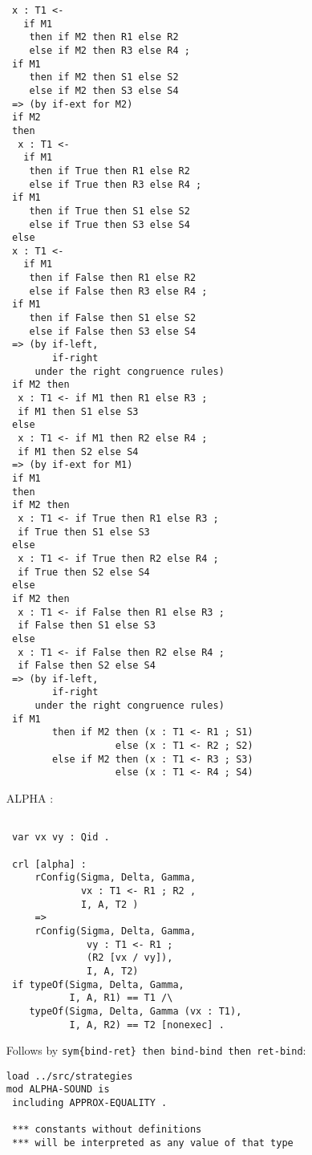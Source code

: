 \documentclass{article}
\begin{document}
\begin{itemize}
\begin{lstlisting}
 x : T1 <- 
   if M1 
    then if M2 then R1 else R2
    else if M2 then R3 else R4 ;
 if M1 
    then if M2 then S1 else S2
    else if M2 then S3 else S4
 => (by if-ext for M2)
 if M2 
 then  
  x : T1 <- 
   if M1 
    then if True then R1 else R2
    else if True then R3 else R4 ;
 if M1 
    then if True then S1 else S2
    else if True then S3 else S4
 else
 x : T1 <- 
   if M1 
    then if False then R1 else R2
    else if False then R3 else R4 ;
 if M1 
    then if False then S1 else S2
    else if False then S3 else S4
 => (by if-left, 
        if-right 
     under the right congruence rules)
 if M2 then
  x : T1 <- if M1 then R1 else R3 ;
  if M1 then S1 else S3
 else
  x : T1 <- if M1 then R2 else R4 ;
  if M1 then S2 else S4
 => (by if-ext for M1)
 if M1 
 then    
 if M2 then
  x : T1 <- if True then R1 else R3 ;
  if True then S1 else S3
 else
  x : T1 <- if True then R2 else R4 ;
  if True then S2 else S4
 else
 if M2 then
  x : T1 <- if False then R1 else R3 ;
  if False then S1 else S3
 else
  x : T1 <- if False then R2 else R4 ;
  if False then S2 else S4 
 => (by if-left, 
        if-right 
     under the right congruence rules)
 if M1 
        then if M2 then (x : T1 <- R1 ; S1) 
                   else (x : T1 <- R2 ; S2)
        else if M2 then (x : T1 <- R3 ; S3) 
                   else (x : T1 <- R4 ; S4)               
\end{lstlisting}  
  
\item[ALPHA]:
\begin{lstlisting}  
 
 var vx vy : Qid . 
        
 crl [alpha] :
     rConfig(Sigma, Delta, Gamma, 
             vx : T1 <- R1 ; R2 , 
             I, A, T2 )
     =>
     rConfig(Sigma, Delta, Gamma, 
              vy : T1 <- R1 ; 
              (R2 [vx / vy]), 
              I, A, T2)
 if typeOf(Sigma, Delta, Gamma, 
           I, A, R1) == T1 /\
    typeOf(Sigma, Delta, Gamma (vx : T1), 
           I, A, R2) == T2 [nonexec] .

\end{lstlisting} 

Follows by \texttt{sym\{bind-ret\} then bind-bind then ret-bind}:
\begin{lstlisting}
load ../src/strategies
mod ALPHA-SOUND is
 including APPROX-EQUALITY . 
 
 *** constants without definitions
 *** will be interpreted as any value of that type 
 

\end{lstlisting}
\end{itemize}
\end{document}
